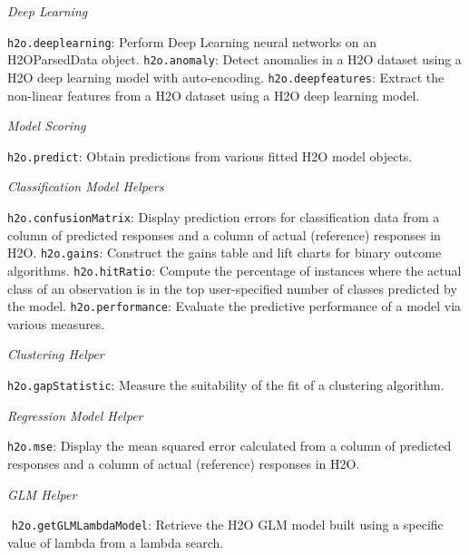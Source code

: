\documentclass[11pt]{article}
\begin{document}
{\emph{Deep Learning}\par
{\texttt{h2o.deeplearning}}: Perform Deep Learning neural networks on an H2OParsedData object.\newline
{\texttt{h2o.anomaly}}: Detect anomalies in a H2O dataset using a H2O deep learning model with auto-encoding.\newline
{\texttt{h2o.deepfeatures}}: Extract the non-linear features from a H2O dataset using a H2O deep learning model.\newline

\emph{Model Scoring}\par
{\texttt{h2o.predict}}: Obtain predictions from various fitted H2O model objects.\newline

\emph{Classification Model Helpers}\par
{\texttt{h2o.confusionMatrix}}: Display prediction errors for classification data from a column of predicted responses and a column of actual (reference) responses in H2O.\newline
{\texttt{h2o.gains}}: Construct the gains table and lift charts for binary outcome algorithms.\newline
{\texttt{h2o.hitRatio}}: Compute the percentage of instances where the actual class of an observation is in the top user-specified number of classes predicted by the model.\newline
{\texttt{h2o.performance}}: Evaluate the predictive performance of a model via various measures.\newline

{\emph{Clustering Helper}}\par
{\texttt{h2o.gapStatistic}}: Measure the suitability of the fit of a clustering algorithm. \newline

\emph{Regression Model Helper}\par
{\texttt{h2o.mse}}: Display the mean squared error calculated from a column of predicted responses and a column of actual (reference) responses in H2O.\newline

\emph{GLM Helper}\par
 {\texttt{h2o.getGLMLambdaModel}}: Retrieve the H2O GLM model built using a specific value of lambda from a lambda search.\newline

}
\end{document}
